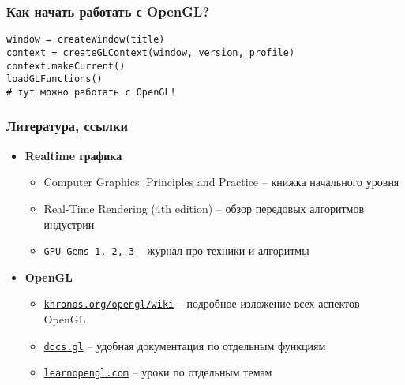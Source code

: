 \documentclass[10pt]{beamer}
\begin{document}
\begin{frame}[fragile]
\frametitle{Как начать работать с OpenGL?}
\begin{verbatim}
window = createWindow(title)
context = createGLContext(window, version, profile)
context.makeCurrent()
loadGLFunctions()
# тут можно работать с OpenGL!
\end{verbatim}
\end{frame}

\begin{frame}
\frametitle{Литература, ссылки}
\begin{itemize}
\item \textbf{Realtime графика}
\begin{itemize}
\item Computer Graphics: Principles and Practice -- книжка начального уровня
\item Real-Time Rendering (4th edition) -- обзор передовых алгоритмов индустрии
\item \href{https://developer.nvidia.com/gpugems}{\texttt{GPU Gems 1, 2, 3}} -- журнал про техники и алгоритмы
\end{itemize}
\item \textbf{OpenGL}
\begin{itemize}
\item \href{https://khronos.org/opengl/wiki}{\nolinkurl{khronos.org/opengl/wiki}} -- подробное изложение всех аспектов OpenGL
\item \href{http://docs.gl}{\nolinkurl{docs.gl}} -- удобная документация по отдельным функциям
\item \href{https://learnopengl.com}{\nolinkurl{learnopengl.com}} -- уроки по отдельным темам
\end{itemize}
\end{itemize}
\end{frame}
\end{document}
